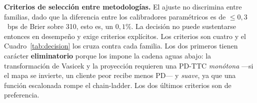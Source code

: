 \documentclass[12pt, a4paper]{article}
\begin{document}
\noindent\textbf{Criterios de selección entre metodologías.} El ajuste no discrimina entre
familias, dado que la diferencia entre los calibradores paramétricos es de $\le0{,}3$~bps de Brier
sobre 310, esto es, un $0{,}1\%$. La decisión no puede sustentarse entonces en desempeño y exige
criterios explícitos. Los criterios son cuatro y el Cuadro~\ref{tab:decision} los cruza contra cada
familia. Los dos primeros tienen carácter \textbf{eliminatorio} porque los impone la cadena aguas
abajo: la transformación de Vasicek y la proyección requieren una PD-TTC \emph{monótona} ---si el
mapa se invierte, un cliente peor recibe menos PD--- y \emph{suave}, ya que una función escalonada
rompe el chain-ladder. Los dos últimos criterios son de preferencia.

\begin{table}[H]
\centering
\caption{Matriz de decisión entre metodologías de calibración. Los criterios 1 y 2 son eliminatorios; 3 y 4 desempatan.}
\label{tab:decision}
\small
{}
\end{table}
\end{document}

